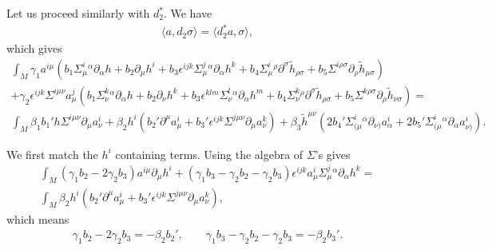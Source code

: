 \documentclass[10pt]{report}
\theoremstyle{definition}
\begin{document}
Let us proceed similarly with $d_2^*$. We have
\begin{align}
\langle a, d_2 \sigma \rangle = \langle d_2^* a, \sigma \rangle,
\end{align}
which gives
\begin{align}\nonumber
\int_M \gamma_1 a^{i\mu} ( b_1 \Sigma^i_\mu{}^\alpha \partial_\alpha h + b_2 \partial_\mu h^i + b_3 \epsilon^{ijk} \Sigma^j_\mu{}^\alpha \partial_\alpha h^k + b_4 \Sigma^i_\mu{}^\rho \partial^\sigma \tilde{h}_{\rho\sigma} + b_5 \Sigma^{i\rho\sigma}  \partial_\rho \tilde{h}_{\mu\sigma}) \\ \nonumber
+ \gamma_2 \epsilon^{ijk} \Sigma^{i\mu\nu} a^j_\mu ( b_1 \Sigma^k_\nu{}^\alpha \partial_\alpha h + b_2 \partial_\nu h^k+ b_3 \epsilon^{klm} \Sigma^l_\nu{}^\alpha \partial_\alpha h^m + b_4 \Sigma^k_\nu{}^\rho \partial^\sigma \tilde{h}_{\rho\sigma} + b_5 \Sigma^{k\rho\sigma}  \partial_\rho \tilde{h}_{\nu\sigma}) = \\ \nonumber
\int_M \beta_1 b_1' h \Sigma^{i\mu\nu} \partial_\mu a_\nu^i + \beta_2 h^i (b_2' \partial^\mu a_\mu^i + b_3' \epsilon^{ijk} \Sigma^{j\mu\nu} \partial_\mu a_\nu^k) + \beta_3 \tilde{h}^{\mu\nu} (2b_4' \Sigma^i_{(\mu}{}^\alpha \partial_{\nu)}a_\alpha^i +  2b_5' \Sigma^i_{(\mu}{}^\alpha \partial_\alpha a_{\nu)}^i).
\end{align}

We first match the $h^i$ containing terms. Using the algebra of $\Sigma$'s gives
\begin{align}
\int_M ( \gamma_1 b_2 - 2 \gamma_2 b_3)a^{i\mu} \partial_\mu h^i + (\gamma_1 b_3 - \gamma_2 b_2 - \gamma_2 b_3) \epsilon^{ijk} a_\mu^i \Sigma^j_\mu{}^\alpha \partial_\alpha h^k  = \\ \nonumber
\int_M \beta_2 h^i (b_2' \partial^\mu a_\mu^i + b_3' \epsilon^{ijk} \Sigma^{j\mu\nu} \partial_\mu a_\nu^k) ,
\end{align}
which means
\begin{align}\label{b-prime-1}
\gamma_1 b_2 - 2 \gamma_2 b_3 = - \beta_2 b_2', \qquad \gamma_1 b_3 - \gamma_2 b_2 - \gamma_2 b_3 = - \beta_2 b_3'.
\end{align}
\end{document}
